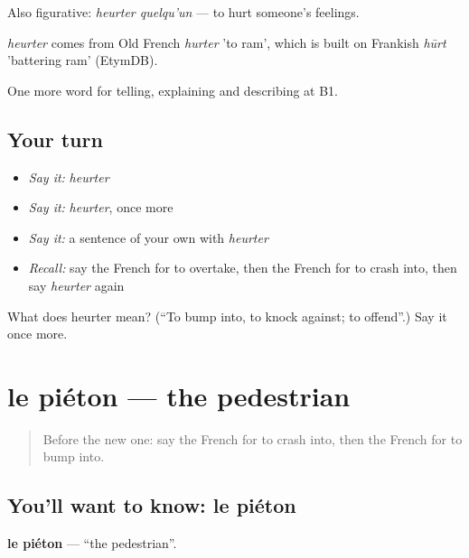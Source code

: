 Also figurative: \emph{heurter quelqu'un} — to hurt someone's feelings.

\begin{cousinweb}
\emph{heurter} comes from Old French \emph{hurter} 'to ram', which is built on Frankish \emph{hūrt} 'battering ram' (EtymDB).
\end{cousinweb}

\begin{grammarlens}[title={What you've built}]
One more word for telling, explaining and describing at B1.
\end{grammarlens}

\subsection*{Your turn}
\begin{itemize}
\raggedright
  \item \emph{Say it:} \emph{heurter}
  \item \emph{Say it:} \emph{heurter}, once more
  \item \emph{Say it:} a sentence of your own with \emph{heurter}
  \item \emph{Recall:} say the French for to overtake, then the French for to crash into, then say \emph{heurter} again
\end{itemize}

\begin{tcolorbox}[breakable,colback=teal!4,colframe=teal!35!black,title={Before you move on}]
What does heurter mean? (\textquotedblleft{}To bump into, to knock against; to offend\textquotedblright{}.) Say it once more.
\end{tcolorbox}
\section[le piéton]{le piéton — the pedestrian}

\label{lesson:FR-C411-pieton}



\begin{quote}
Before the new one: say the French for to crash into, then the French for to bump into.
\end{quote}

\subsection*{You'll want to know: le piéton}
\textbf{le piéton} — \textquotedblleft{}the pedestrian\textquotedblright{}.


